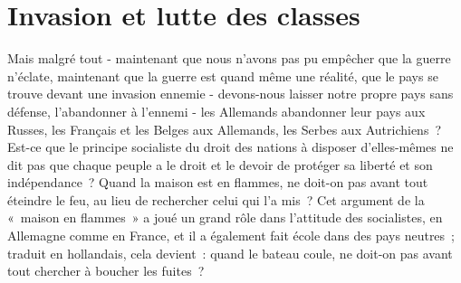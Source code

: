 \documentclass[french,twoside]{book} %
\begin{document}
\section[{Invasion et lutte des classes}]{Invasion et lutte des classes}\renewcommand{\leftmark}{Invasion et lutte des classes}

\noindent Mais malgré tout - maintenant que nous n’avons pas pu empêcher que la guerre n’éclate, maintenant que la guerre est quand même une réalité, que le pays se trouve devant une invasion ennemie - devons-nous laisser notre propre pays sans défense, l’abandonner à l’ennemi - les Allemands abandonner leur pays aux Russes, les Français et les Belges aux Allemands, les Serbes aux Autrichiens ? Est-ce que le  principe socialiste du droit des nations à disposer d’elles-mêmes ne dit pas que chaque peuple a le droit et le devoir de protéger sa liberté et son indépendance ? Quand la maison est en flammes, ne doit-on pas avant tout éteindre le feu, au lieu de rechercher celui qui l’a mis ? Cet argument de la « maison en flammes » a joué un grand rôle dans l’attitude des socialistes, en Allemagne comme en France, et il a également fait école dans des pays neutres ; traduit en hollandais, cela devient : quand le bateau coule, ne doit-on pas avant tout chercher à boucher les fuites ?\par
\end{document}
